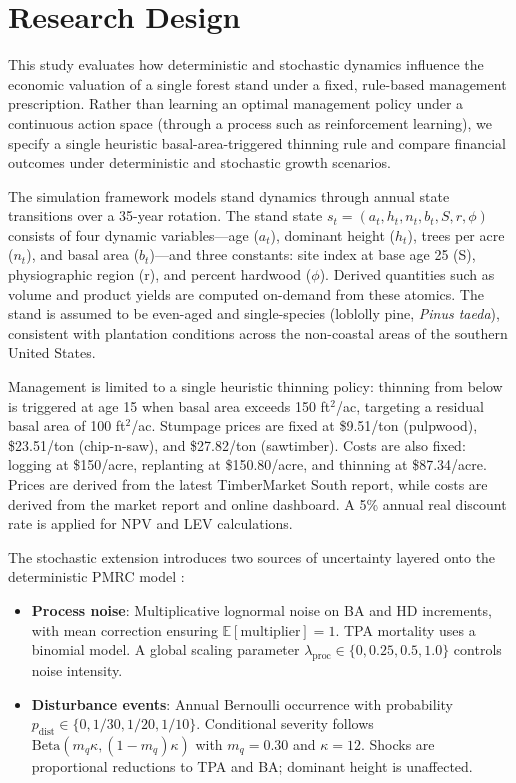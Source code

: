 \documentclass[12pt]{report}
\begin{document}
\section{Research Design}

This study evaluates how deterministic and stochastic dynamics influence the economic valuation of a single forest stand under a fixed, rule-based management prescription. Rather than learning an optimal management policy under a continuous action space (through a process such as reinforcement learning), we specify a single heuristic basal-area-triggered thinning rule and compare financial outcomes under deterministic and stochastic growth scenarios.

The simulation framework models stand dynamics through annual state transitions over a 35-year rotation. The stand state $s_t = (a_t, h_t, n_t, b_t, S, r, \phi)$ consists of four dynamic variables---age ($a_t$), dominant height ($h_t$), trees per acre ($n_t$), and basal area ($b_t$)---and three constants: site index at base age 25 (S), physiographic region (r), and percent hardwood ($\phi$). Derived quantities such as volume and product yields are computed on-demand from these atomics. The stand is assumed to be even-aged and single-species (loblolly pine, \textit{Pinus taeda}), consistent with plantation conditions across the non-coastal areas of the southern United States.

Management is limited to a single heuristic thinning policy: thinning from below is triggered at age 15 when basal area exceeds 150 ft$^2$/ac, targeting a residual basal area of 100 ft$^2$/ac. Stumpage prices are fixed at \$9.51/ton (pulpwood), \$23.51/ton (chip-n-saw), and \$27.82/ton (sawtimber). Costs are also fixed: logging at \$150/acre, replanting at \$150.80/acre, and thinning at \$87.34/acre. Prices are derived from the latest TimberMarket South report, while costs are derived from the \textcite{costsMaggardNatzke} market report and online dashboard. A 5\% annual real discount rate is applied for NPV and LEV calculations.

The stochastic extension introduces two sources of uncertainty layered onto the deterministic PMRC model \parencite{pmrcHarrisonYieldPredictionGrowth1996}:
\begin{itemize}
    \item \textbf{Process noise}: Multiplicative lognormal noise on BA and HD increments, with mean correction ensuring $\mathbb{E}[\text{multiplier}] = 1$. TPA mortality uses a binomial model. A global scaling parameter $\lambda_{\text{proc}} \in \{0, 0.25, 0.5, 1.0\}$ controls noise intensity.
    \item \textbf{Disturbance events}: Annual Bernoulli occurrence with probability $p_{\text{dist}} \in \{0, 1/30, 1/20, 1/10\}$. Conditional severity follows $\text{Beta}(m_q \kappa, (1-m_q)\kappa)$ with $m_q = 0.30$ and $\kappa = 12$. Shocks are proportional reductions to TPA and BA; dominant height is unaffected.
\end{itemize}
\end{document}
